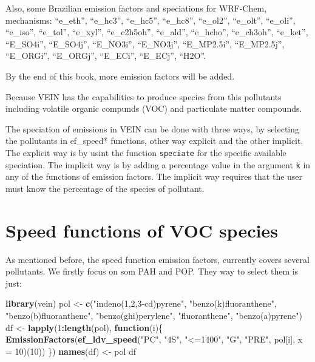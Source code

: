 \documentclass[12pt,graybox,envcountchap,sectrefs]{krantz}
\makeatletter
\newenvironment{Shaded}{\begin{snugshade}}{\end{snugshade}}
\newcommand{\KeywordTok}[1]{\textcolor[rgb]{0.13,0.29,0.53}{\textbf{#1}}}
\newcommand{\DataTypeTok}[1]{\textcolor[rgb]{0.13,0.29,0.53}{#1}}
\newcommand{\DecValTok}[1]{\textcolor[rgb]{0.00,0.00,0.81}{#1}}
\newcommand{\StringTok}[1]{\textcolor[rgb]{0.31,0.60,0.02}{#1}}
\newcommand{\ControlFlowTok}[1]{\textcolor[rgb]{0.13,0.29,0.53}{\textbf{#1}}}
\newcommand{\OperatorTok}[1]{\textcolor[rgb]{0.81,0.36,0.00}{\textbf{#1}}}
\newcommand{\NormalTok}[1]{#1}
\newenvironment{kframe}{%
\medskip{}
\setlength{\fboxsep}{.8em}
 \def\at@end@of@kframe{}%
 \ifinner\ifhmode%
  \def\at@end@of@kframe{\end{minipage}}%
  \begin{minipage}{\columnwidth}%
 \fi\fi%
 \def\FrameCommand##1{\hskip\@totalleftmargin \hskip-\fboxsep
 \colorbox{shadecolor}{##1}\hskip-\fboxsep
     \hskip-\linewidth \hskip-\@totalleftmargin \hskip\columnwidth}%
 \MakeFramed {\advance\hsize-\width
   \@totalleftmargin\z@ \linewidth\hsize
   \@setminipage}}%
 {\par\unskip\endMakeFramed%
 \at@end@of@kframe}
\renewenvironment{Shaded}{\begin{kframe}}{\end{kframe}}
\theoremstyle{definition}
\theoremstyle{definition}
\theoremstyle{definition}
\theoremstyle{remark}
\makeatother
\begin{document}
Also, some Brazilian emission factors and speciations for WRF-Chem,
mechanisms: ``e\_eth'', ``e\_hc3'', ``e\_hc5'', ``e\_hc8'', ``e\_ol2'',
``e\_olt'', ``e\_oli'', ``e\_iso'', ``e\_tol'', ``e\_xyl'',
``e\_c2h5oh'', ``e\_ald'', ``e\_hcho'', ``e\_ch3oh'', ``e\_ket'',
``E\_SO4i'', ``E\_SO4j'', ``E\_NO3i'', ``E\_NO3j'', ``E\_MP2.5i'',
``E\_MP2.5j'', ``E\_ORGi'', ``E\_ORGj'', ``E\_ECi'', ``E\_ECj'',
``H2O''.

By the end of this book, more emission factors will be added.

Because VEIN has the capabilities to produce species from this
pollutants including volatile organic compunds (VOC) and particulate
matter compounds.

The speciation of emissions in VEIN can be done with three ways, by
selecting the pollutants in ef\_speed* functions, other way explicit and
the other implicit. The explicit way is by usint the function
\texttt{speciate} for the specific available speciation. The implicit
way is by adding a percentage value in the argument \texttt{k} in any of
the functions of emission factors. The implicit way requires that the
user must know the percentage of the species of pollutant.

\section{Speed functions of VOC
species}\label{speed-functions-of-voc-species}

As mentioned before, the speed function emission factors, currently
covers several pollutants. We firstly focus on som PAH and POP. They way
to select them is just:

\begin{Shaded}
\begin{Highlighting}[]
\KeywordTok{library}\NormalTok{(vein)}
\NormalTok{pol <-}\StringTok{ }\KeywordTok{c}\NormalTok{(}\StringTok{"indeno(1,2,3-cd)pyrene"}\NormalTok{, }\StringTok{"benzo(k)fluoranthene"}\NormalTok{,}
         \StringTok{"benzo(b)fluoranthene"}\NormalTok{, }\StringTok{"benzo(ghi)perylene"}\NormalTok{, }\StringTok{"fluoranthene"}\NormalTok{,}
         \StringTok{"benzo(a)pyrene"}\NormalTok{)}
\NormalTok{df <-}\StringTok{ }\KeywordTok{lapply}\NormalTok{(}\DecValTok{1}\OperatorTok{:}\KeywordTok{length}\NormalTok{(pol), }\ControlFlowTok{function}\NormalTok{(i)\{}
  \KeywordTok{EmissionFactors}\NormalTok{(}\KeywordTok{ef_ldv_speed}\NormalTok{(}\StringTok{"PC"}\NormalTok{, }\StringTok{"4S"}\NormalTok{, }\StringTok{"<=1400"}\NormalTok{, }\StringTok{"G"}\NormalTok{, }\StringTok{"PRE"}\NormalTok{,}
\NormalTok{                               pol[i], }\DataTypeTok{x =} \DecValTok{10}\NormalTok{)(}\DecValTok{10}\NormalTok{))}
\NormalTok{\})}
\KeywordTok{names}\NormalTok{(df) <-}\StringTok{ }\NormalTok{pol}
\NormalTok{df}
\end{Highlighting}
\end{Shaded}
\end{document}
